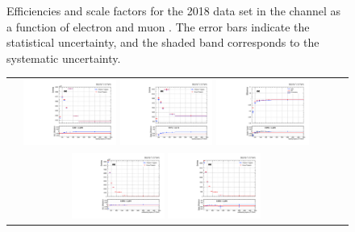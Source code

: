 \begin{figure}[htb]
\begin{center}
\begin{tabular}{ccc}
    \end{tabular}
    \caption{Efficiencies and scale factors for the 2018 data set in the \emu channel as a function of electron and muon \pT.
            The error bars indicate the statistical uncertainty, and the shaded band corresponds to the systematic uncertainty.
            }
    \label{TrigSF_2018_1}
  \end{center}
\end{figure}

\begin{figure}[htb]
  \begin{center}
    \begin{tabular}{ccc}
      \includegraphics[width=0.30\textwidth]{fig_2018_TrigSF/g_lepApt_ee_MC.pdf}
      \includegraphics[width=0.30\textwidth]{fig_2018_TrigSF/g_lepApt_ee_data.pdf}
      \includegraphics[width=0.30\textwidth]{fig_2018_TrigSF/g_ee_lepApt_FullSystUncBand.pdf}\\
      \includegraphics[width=0.30\textwidth]{fig_2018_TrigSF/g_lepBpt_ee_MC.pdf}
      \includegraphics[width=0.30\textwidth]{fig_2018_TrigSF/g_lepBpt_ee_data.pdf}

\end{tabular}
\end{center}
\end{figure}

